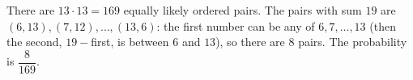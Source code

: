 There are $13\cdot13=169$ equally likely ordered pairs. The pairs with sum $19$ are $(6,13),(7,12),\dots,(13,6)$: the first number can be any of $6,7,\dots,13$ (then the second, $19-$first, is between $6$ and $13$), so there are $8$ pairs. The probability is $\boxed{\dfrac{8}{169}}$.
